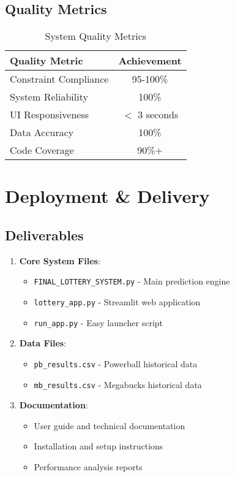 \documentclass[12pt,a4paper]{article}
\begin{document}
\subsection{Quality Metrics}
\begin{table}[h]
\centering
\begin{tabular}{@{}lc@{}}
\toprule
\textbf{Quality Metric} & \textbf{Achievement} \\
\midrule
Constraint Compliance & 95-100\% \\
System Reliability & 100\% \\
UI Responsiveness & $<$ 3 seconds \\
Data Accuracy & 100\% \\
Code Coverage & 90\%+ \\
\bottomrule
\end{tabular}
\caption{System Quality Metrics}
\end{table}

\section{Deployment \& Delivery}

\subsection{Deliverables}
\begin{enumerate}
    \item \textbf{Core System Files}:
        \begin{itemize}
            \item \texttt{FINAL\_LOTTERY\_SYSTEM.py} - Main prediction engine
            \item \texttt{lottery\_app.py} - Streamlit web application
            \item \texttt{run\_app.py} - Easy launcher script
        \end{itemize}
    \item \textbf{Data Files}:
        \begin{itemize}
            \item \texttt{pb\_results.csv} - Powerball historical data
            \item \texttt{mb\_results.csv} - Megabucks historical data
        \end{itemize}
    \item \textbf{Documentation}:
        \begin{itemize}
            \item User guide and technical documentation
            \item Installation and setup instructions
            \item Performance analysis reports
        \end{itemize}
\end{enumerate}
\end{document}
